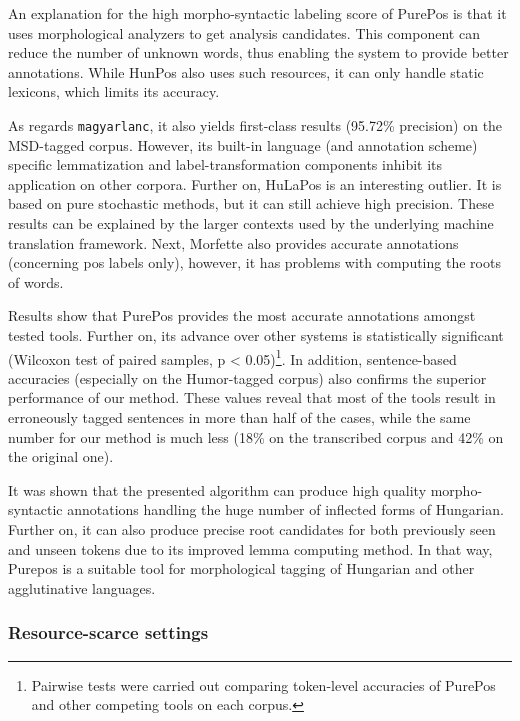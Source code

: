 An explanation for the high morpho-syntactic labeling score of PurePos is that it uses morphological analyzers to get analysis candidates. 
This component can reduce the number of unknown words, thus enabling the system to provide better annotations.
While HunPos also uses such resources, it can only handle static lexicons, which limits its accuracy.

As regards \texttt{magyarlanc}, it also yields first-class results (95.72\% precision) on the MSD-tagged corpus.
However, its built-in language (and annotation scheme) specific lemmatization and label-transformation components inhibit its application on other corpora. 
Further on, HuLaPos is an interesting outlier.
It is based on pure stochastic methods, but it can still achieve high precision. 
These results can be explained by the larger contexts used by the underlying machine translation framework.
Next, Morfette also provides accurate annotations (concerning \acrshort{pos} labels only), however, it has problems with computing the roots of words.

Results show that PurePos provides the most accurate annotations amongst tested tools.
Further on, its advance over other systems is statistically significant (Wilcoxon test of paired samples, p < 0.05)\footnote{Pairwise tests were carried out comparing token-level accuracies of PurePos and other competing tools on each corpus.}.
In addition, sentence-based accuracies (especially on the Humor-tagged corpus) also confirms the superior performance of our method. 
These values reveal that most of the tools result in erroneously tagged sentences in more than half of the cases, while the same number for our method is much less (18\% on the transcribed corpus and 42\% on the original one). 

It was shown that the presented algorithm can produce high quality morpho-syntactic annotations handling the huge number of inflected forms of Hungarian.
Further on, it can also produce precise root candidates for both previously seen and unseen tokens due to its improved lemma computing method.
In that way, Purepos is a suitable tool for morphological tagging of Hungarian and other agglutinative languages.
%

\subsubsection{Resource-scarce settings}

